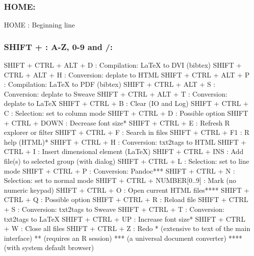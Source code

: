 \subsubsection{HOME:}

\vspace{-0.5cm}
\begin{Rtables}[caption={[HOME keyboard shortcut]
    HOME keyboard shortcut},
  label=shortcut:home]
  HOME    : Beginning line
\end{Rtables}


\newpage
\subsubsection{SHIFT + : A-Z, 0-9 and /:}

\begin{Rtables}[caption={[SHIFT + keyboard shortcuts]
    SHIFT + keyboard shortcuts},
  label=shortcut:shiftplus]
  SHIFT + CTRL + ALT + D      : Compilation: LaTeX to DVI (bibtex)
  SHIFT + CTRL + ALT + H      : Conversion: deplate to HTML
  SHIFT + CTRL + ALT + P      : Compilation: LaTeX to PDF (bibtex)
  SHIFT + CTRL + ALT + S      : Conversion: deplate to Sweave
  SHIFT + CTRL + ALT + T      : Conversion: deplate to LaTeX
  SHIFT + CTRL + B            : Clear (IO and Log)
  SHIFT + CTRL + C            : Selection: set to column mode
  SHIFT + CTRL + D            : Possible option
  SHIFT + CTRL + DOWN         : Decrease font size*
  SHIFT + CTRL + E            : Refresh R explorer or filter
  SHIFT + CTRL + F            : Search in files
  SHIFT + CTRL + F1           : R help (HTML)*
  SHIFT + CTRL + H            : Conversion: txt2tags to HTML
  SHIFT + CTRL + I            : Insert dimensional element (LaTeX)
  SHIFT + CTRL + INS          : Add file(s) to selected group (with dialog)
  SHIFT + CTRL + L            : Selection: set to line mode
  SHIFT + CTRL + P            : Conversion: Pandoc***
  SHIFT + CTRL + N            : Selection: set to normal mode
  SHIFT + CTRL + NUMBER[0..9] : Mark (no numeric keypad)
  SHIFT + CTRL + O            : Open current HTML files****
  SHIFT + CTRL + Q            : Possible option
  SHIFT + CTRL + R            : Reload file
  SHIFT + CTRL + S            : Conversion: txt2tags to Sweave
  SHIFT + CTRL + T            : Conversion: txt2tags to LaTeX
  SHIFT + CTRL + UP           : Increase font size*
  SHIFT + CTRL + W            : Close all files
  SHIFT + CTRL + Z            : Redo
  *    (extensive to text of the main interface)
  **   (requires an R session)
  ***  (a universal document converter)
  **** (with system default browser)
\end{Rtables}
